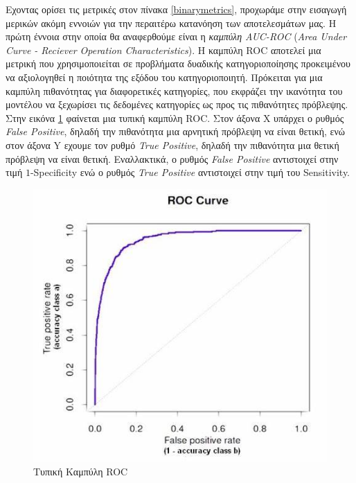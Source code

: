 \medskip
Εχοντας ορίσει τις μετρικές στον πίνακα \ref{binarymetrics}, προχωράμε στην εισαγωγή μερικών ακόμη εννοιών για την περαιτέρω κατανόηση των αποτελεσμάτων μας. Η πρώτη έννοια στην οποία θα αναφερθούμε είναι η \textit{καμπύλη AUC-ROC} (\textit{Area Under Curve - Reciever Operation Characteristics}). Η καμπύλη ROC αποτελεί μια μετρική που χρησιμοποιείται σε προβλήματα δυαδικής κατηγοριοποίησης προκειμένου να αξιολογηθεί η ποιότητα της εξόδου του κατηγοριοποιητή. Πρόκειται για μια καμπύλη πιθανότητας για διαφορετικές κατηγορίες, που εκφράζει την ικανότητα του μοντέλου να ξεχωρίσει τις δεδομένες κατηγορίες ως προς τις πιθανότητες πρόβλεψης. Στην εικόνα \ref{fig:ROC} φαίνεται μια τυπική καμπύλη ROC. Στον άξονα X υπάρχει ο ρυθμός \textit{False Positive}, δηλαδή την πιθανότητα μια αρνητική πρόβλεψη να είναι θετική, ενώ στον άξονα Y εχουμε τον ρυθμό \textit{True Positive}, δηλαδή την πιθανότητα μια θετική πρόβλεψη να είναι θετική. Εναλλακτικά, ο ρυθμός \textit{False Positive} αντιστοιχεί στην τιμή $1$-Specificity ενώ ο ρυθμός \textit{True Positive} αντιστοιχεί στην τιμή του Sensitivity.

\begin{figure}[H]
  \centering
  \includegraphics[width=1\textwidth]{images/ROC.jpg}
  \caption{Τυπική Καμπύλη ROC}
  \label{fig:ROC}
\end{figure}

